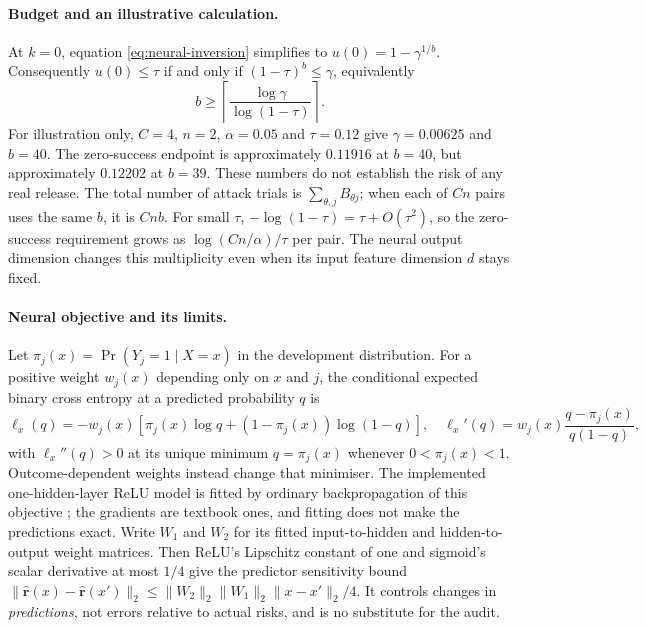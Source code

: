 \paragraph{Budget and an illustrative calculation.}
At $k=0$, equation \eqref{eq:neural-inversion} simplifies to
$u(0)=1-\gamma^{1/b}$. Consequently $u(0)\leq\tau$ if and only if
$(1-\tau)^b\leq\gamma$, equivalently
\begin{equation}
 b\geq\left\lceil\frac{\log\gamma}{\log(1-\tau)}\right\rceil.
 \label{eq:neural-budget-proof}
\end{equation}
For illustration only, $C=4$, $n=2$, $\alpha=0.05$ and $\tau=0.12$ give
$\gamma=0.00625$ and $b=40$. The zero-success endpoint is approximately
$0.11916$ at $b=40$, but approximately $0.12202$ at $b=39$.
These numbers do not establish the risk of any real release. The total number
of attack trials is $\sum_{\theta,j}B_{\theta j}$; when each of $Cn$ pairs
uses the same $b$, it is $Cnb$. For small $\tau$,
$-\log(1-\tau)=\tau+O(\tau^2)$, so the zero-success requirement grows as
$\log(Cn/\alpha)/\tau$ per pair. The neural output dimension changes this
multiplicity even when its input feature dimension $d$ stays fixed.

\paragraph{Neural objective and its limits.}
Let $\pi_j(x)=\Pr(Y_j=1\mid X=x)$ in the development distribution. For a
positive weight $w_j(x)$ depending only on $x$ and $j$, the conditional
expected binary cross entropy at a predicted probability $q$ is
\begin{equation}
 \ell_x(q)=-w_j(x)[\pi_j(x)\log q+(1-\pi_j(x))\log(1-q)],
 \quad \ell_x'(q)=w_j(x)\frac{q-\pi_j(x)}{q(1-q)},
 \label{eq:neural-proper}
\end{equation}
with $\ell_x''(q)>0$ at its unique minimum $q=\pi_j(x)$ whenever
$0<\pi_j(x)<1$. Outcome-dependent weights instead change that minimiser.
The implemented one-hidden-layer ReLU model is fitted by ordinary
backpropagation of this objective \citep[ch.~6]{goodfellow2016}; the gradients are
textbook ones, and fitting does not make the predictions exact. Write $W_1$ and
$W_2$ for its fitted input-to-hidden and hidden-to-output weight matrices. Then
ReLU's Lipschitz constant of one and sigmoid's scalar derivative at most
$1/4$ give the predictor sensitivity bound
$\|\widehat{\boldsymbol r}(x)-\widehat{\boldsymbol r}(x')\|_2
\leq\|W_2\|_2\|W_1\|_2\|x-x'\|_2/4$.
It controls changes in \emph{predictions}, not errors relative to actual
risks, and is no substitute for the audit.

